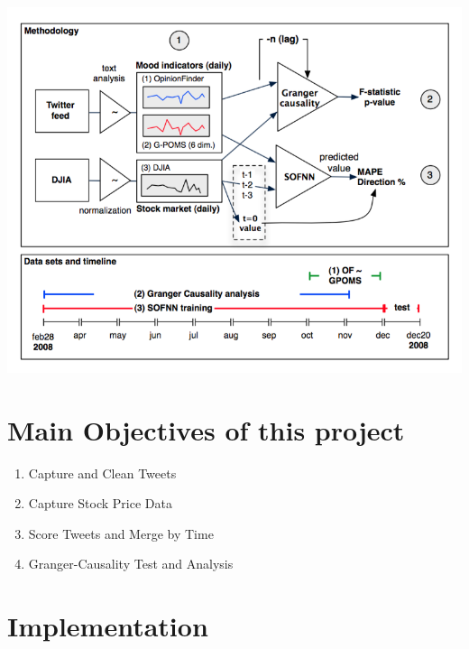 \documentclass[a0,landscape]{a0poster}\usepackage[]{graphicx}\usepackage[]{color}
\begin{document}
\begin{multicols}{4}
\begin{minipage}[b]{0.14\linewidth}
\includegraphics[width=24cm]{TwitterPredictionPulibcation.png} %
\end{minipage}


\color{DarkSlateGray} %

\section*{Main Objectives of this project}


\begin{enumerate}
\item Capture and Clean Tweets
\item Capture Stock Price Data
\item Score Tweets and Merge by Time
\item Granger-Causality Test and Analysis
\end{enumerate}


\section*{Implementation}


\end{multicols}
\end{document}
